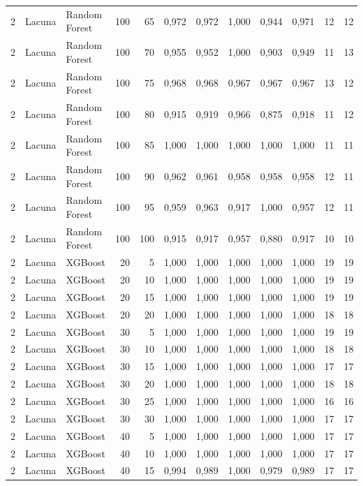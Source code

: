 \begin{longtable}{@{}rllrrrrrrrrr@{}}
2 & Lacuna & Random Forest & 100 & 65 & 0,972 & 0,972 & 1,000 & 0,944 & 0,971 & 12 & 12 \\
2 & Lacuna & Random Forest & 100 & 70 & 0,955 & 0,952 & 1,000 & 0,903 & 0,949 & 11 & 13 \\
2 & Lacuna & Random Forest & 100 & 75 & 0,968 & 0,968 & 0,967 & 0,967 & 0,967 & 13 & 12 \\
2 & Lacuna & Random Forest & 100 & 80 & 0,915 & 0,919 & 0,966 & 0,875 & 0,918 & 11 & 12 \\
2 & Lacuna & Random Forest & 100 & 85 & 1,000 & 1,000 & 1,000 & 1,000 & 1,000 & 11 & 11 \\
2 & Lacuna & Random Forest & 100 & 90 & 0,962 & 0,961 & 0,958 & 0,958 & 0,958 & 12 & 11 \\
2 & Lacuna & Random Forest & 100 & 95 & 0,959 & 0,963 & 0,917 & 1,000 & 0,957 & 12 & 11 \\
2 & Lacuna & Random Forest & 100 & 100 & 0,915 & 0,917 & 0,957 & 0,880 & 0,917 & 10 & 10 \\
2 & Lacuna & XGBoost & 20 & 5 & 1,000 & 1,000 & 1,000 & 1,000 & 1,000 & 19 & 19 \\
2 & Lacuna & XGBoost & 20 & 10 & 1,000 & 1,000 & 1,000 & 1,000 & 1,000 & 19 & 19 \\
2 & Lacuna & XGBoost & 20 & 15 & 1,000 & 1,000 & 1,000 & 1,000 & 1,000 & 19 & 19 \\
2 & Lacuna & XGBoost & 20 & 20 & 1,000 & 1,000 & 1,000 & 1,000 & 1,000 & 18 & 18 \\
2 & Lacuna & XGBoost & 30 & 5 & 1,000 & 1,000 & 1,000 & 1,000 & 1,000 & 19 & 19 \\
2 & Lacuna & XGBoost & 30 & 10 & 1,000 & 1,000 & 1,000 & 1,000 & 1,000 & 18 & 18 \\
2 & Lacuna & XGBoost & 30 & 15 & 1,000 & 1,000 & 1,000 & 1,000 & 1,000 & 17 & 17 \\
2 & Lacuna & XGBoost & 30 & 20 & 1,000 & 1,000 & 1,000 & 1,000 & 1,000 & 18 & 18 \\
2 & Lacuna & XGBoost & 30 & 25 & 1,000 & 1,000 & 1,000 & 1,000 & 1,000 & 16 & 16 \\
2 & Lacuna & XGBoost & 30 & 30 & 1,000 & 1,000 & 1,000 & 1,000 & 1,000 & 17 & 17 \\
2 & Lacuna & XGBoost & 40 & 5 & 1,000 & 1,000 & 1,000 & 1,000 & 1,000 & 17 & 17 \\
2 & Lacuna & XGBoost & 40 & 10 & 1,000 & 1,000 & 1,000 & 1,000 & 1,000 & 17 & 17 \\
2 & Lacuna & XGBoost & 40 & 15 & 0,994 & 0,989 & 1,000 & 0,979 & 0,989 & 17 & 17 \\

\end{longtable}
